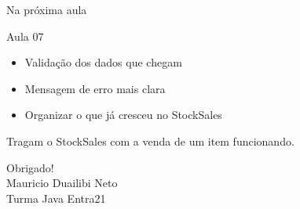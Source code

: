 \documentclass[aspectratio=169,11pt]{beamer}
\begin{document}
\begin{frame}{Na próxima aula}
  \begin{block}{Aula 07}
    \begin{itemize}
      \item Validação dos dados que chegam
      \item Mensagem de erro mais clara
      \item Organizar o que já cresceu no StockSales
    \end{itemize}
  \end{block}

  \vspace{0.6em}
  Tragam o StockSales com a venda de um item funcionando.
\end{frame}

\begin{frame}
  \begin{center}
    \Huge Obrigado!\\[1.2em]
    \normalsize Mauricio Duailibi Neto\\
    Turma Java Entra21
  \end{center}
\end{frame}
\end{document}
